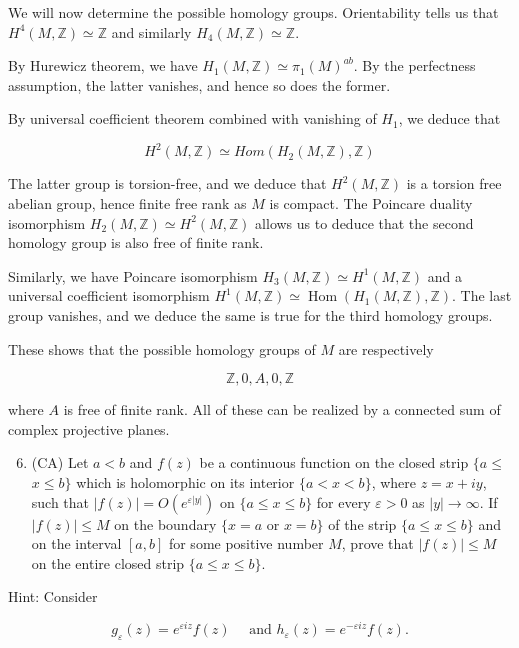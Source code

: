 \documentclass[10pt]{article}
\begin{document}
We will now determine the possible homology groups. Orientability tells us that $H^{4}(M, \mathbb{Z}) \simeq \mathbb{Z}$ and similarly $H_{4}(M, \mathbb{Z}) \simeq \mathbb{Z}$.

By Hurewicz theorem, we have $H_{1}(M, \mathbb{Z}) \simeq \pi_{1}(M)^{a b}$. By the perfectness assumption, the latter vanishes, and hence so does the former.

By universal coefficient theorem combined with vanishing of $H_{1}$, we deduce that

$$
H^{2}(M, \mathbb{Z}) \simeq H o m\left(H_{2}(M, \mathbb{Z}), \mathbb{Z}\right)
$$

The latter group is torsion-free, and we deduce that $H^{2}(M, \mathbb{Z})$ is a torsion free abelian group, hence finite free rank as $M$ is compact. The Poincare duality isomorphism $H_{2}(M, \mathbb{Z}) \simeq H^{2}(M, \mathbb{Z})$ allows us to deduce that the second homology group is also free of finite rank.

Similarly, we have Poincare isomorphism $H_{3}(M, \mathbb{Z}) \simeq H^{1}(M, \mathbb{Z})$ and a universal coefficient isomorphism $H^{1}(M, \mathbb{Z}) \simeq \operatorname{Hom}\left(H_{1}(M, \mathbb{Z}), \mathbb{Z}\right)$. The last group vanishes, and we deduce the same is true for the third homology groups.

These shows that the possible homology groups of $M$ are respectively

$$
\mathbb{Z}, 0, A, 0, \mathbb{Z}
$$

where $A$ is free of finite rank. All of these can be realized by a connected sum of complex projective planes.

\begin{enumerate}
  \setcounter{enumi}{5}
  \item (CA) Let $a<b$ and $f(z)$ be a continuous function on the closed strip $\{a \leq$ $x \leq b\}$ which is holomorphic on its interior $\{a<x<b\}$, where $z=x+i y$, such that $|f(z)|=O\left(e^{\varepsilon|y|}\right)$ on $\{a \leq x \leq b\}$ for every $\varepsilon>0$ as $|y| \rightarrow \infty$. If $|f(z)| \leq M$ on the boundary $\{x=a$ or $x=b\}$ of the strip $\{a \leq x \leq b\}$ and on the interval $[a, b]$ for some positive number $M$, prove that $|f(z)| \leq M$ on the entire closed strip $\{a \leq x \leq b\}$.
\end{enumerate}

Hint: Consider

$$
g_{\varepsilon}(z)=e^{\varepsilon i z} f(z) \quad \text { and } h_{\varepsilon}(z)=e^{-\varepsilon i z} f(z) .
$$
\end{document}
